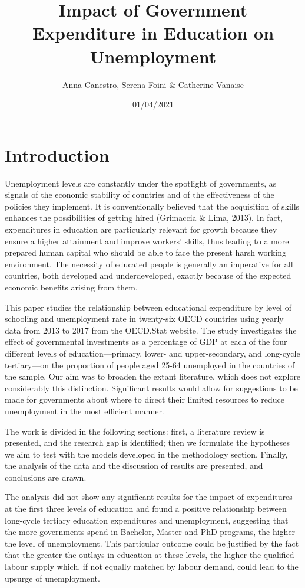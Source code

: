 \documentclass[
]{article}
\title{Impact of Government Expenditure in Education on Unemployment}
\author{Anna Canestro, Serena Foini \& Catherine Vanaise}
\date{01/04/2021}
\begin{document}
\maketitle

\hypertarget{introduction}{%
\section{Introduction}\label{introduction}}

Unemployment levels are constantly under the spotlight of governments,
as signals of the economic stability of countries and of the
effectiveness of the policies they implement. It is conventionally
believed that the acquisition of skills enhances the possibilities of
getting hired (Grimaccia \& Lima, 2013). In fact, expenditures in
education are particularly relevant for growth because they ensure a
higher attainment and improve workers' skills, thus leading to a more
prepared human capital who should be able to face the present harsh
working environment. The necessity of educated people is generally an
imperative for all countries, both developed and underdeveloped, exactly
because of the expected economic benefits arising from them.

This paper studies the relationship between educational expenditure by
level of schooling and unemployment rate in twenty-six OECD countries
using yearly data from 2013 to 2017 from the OECD.Stat website. The
study investigates the effect of governmental investments as a
percentage of GDP at each of the four different levels of
education---primary, lower- and upper-secondary, and long-cycle
tertiary---on the proportion of people aged 25-64 unemployed in the
countries of the sample. Our aim was to broaden the extant literature,
which does not explore considerably this distinction. Significant
results would allow for suggestions to be made for governments about
where to direct their limited resources to reduce unemployment in the
most efficient manner.

The work is divided in the following sections: first, a literature
review is presented, and the research gap is identified; then we
formulate the hypotheses we aim to test with the models developed in the
methodology section. Finally, the analysis of the data and the
discussion of results are presented, and conclusions are drawn.

The analysis did not show any significant results for the impact of
expenditures at the first three levels of education and found a positive
relationship between long-cycle tertiary education expenditures and
unemployment, suggesting that the more governments spend in Bachelor,
Master and PhD programs, the higher the level of unemployment. This
particular outcome could be justified by the fact that the greater the
outlays in education at these levels, the higher the qualified labour
supply which, if not equally matched by labour demand, could lead to the
upsurge of unemployment.
\end{document}
